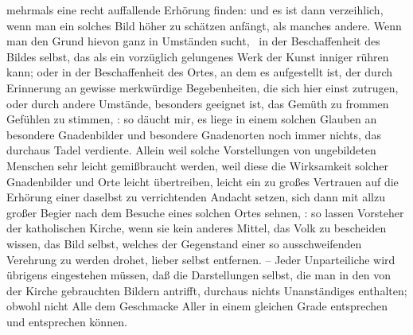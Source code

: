 \begin{RWanm}
mehrmals eine recht auffallende Erhörung finden: und es ist dann verzeihlich, wenn man ein solches Bild höher zu schätzen anfängt, als manches andere. Wenn man den Grund hievon ganz in  Umständen sucht, \zB\  in der Beschaffenheit des Bildes selbst, das als ein vorzüglich gelungenes Werk der Kunst inniger rühren kann; oder in der Beschaffenheit des Ortes, an dem es aufgestellt ist, der durch Erinnerung an gewisse merkwürdige Begebenheiten, die sich hier einst zutrugen, oder durch andere Umstände, besonders geeignet ist, das Gemüth zu frommen Gefühlen zu stimmen, \udgl : so däucht mir, es liege in einem solchen Glauben an besondere Gnadenbilder und besondere Gnadenorten noch immer nichts, das durchaus Tadel verdiente. Allein weil solche Vorstellungen von ungebildeten Menschen sehr leicht gemißbraucht werden, weil diese die Wirksamkeit solcher Gnadenbilder und Orte leicht übertreiben, leicht ein zu großes Vertrauen auf die Erhörung einer daselbst zu verrichtenden Andacht setzen, sich dann mit allzu großer Begier nach dem Besuche eines solchen Ortes sehnen, \udgl : so lassen  Vorsteher der katholischen Kirche, wenn sie kein anderes Mittel, das Volk zu bescheiden wissen, das Bild selbst, welches der Gegenstand einer so ausschweifenden Verehrung zu werden drohet, lieber selbst entfernen. -- Jeder Unparteiliche wird übrigens eingestehen müssen, daß die Darstellungen selbst, die man in den von der Kirche  gebrauchten Bildern antrifft, durchaus nichts Unanständiges enthalten; obwohl nicht Alle dem Geschmacke Aller in einem gleichen Grade entsprechen und entsprechen können. 
\end{RWanm}

